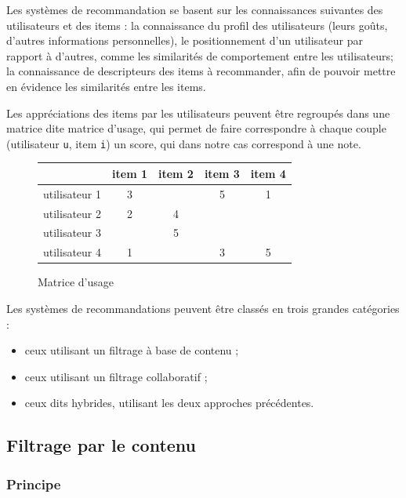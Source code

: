 \documentclass{article}
\begin{document}
Les systèmes de recommandation se basent sur les connaissances suivantes des utilisateurs et des items : la connaissance du profil des utilisateurs (leurs goûts, d'autres informations personnelles), le positionnement d'un utilisateur par rapport à d'autres, comme les similarités de comportement entre les utilisateurs; la connaissance de descripteurs des items à recommander, afin de pouvoir mettre en évidence les similarités entre les items.

Les appréciations des items par les utilisateurs peuvent être regroupés dans une matrice dite matrice d'usage, qui permet de faire correspondre à chaque couple (utilisateur \verb'u', item \verb'i') un score, qui dans notre cas correspond à une note.
 \begin{figure}[!h]
\begin{center}
\begin{tabular}{|c|c|c|c|c|}
\hline
&item 1&item 2&item 3&item 4\\
\hline
utilisateur 1&3&&5&1\\
\hline
utilisateur 2&2&4&&\\
\hline
utilisateur 3&&5&&\\
\hline
utilisateur 4&1&&3&5\\
\hline
\end{tabular}
\newline\newline
\caption{Matrice d'usage}
\end{center}
 \end{figure}

Les systèmes de recommandations peuvent être classés en trois grandes catégories : 
\begin{itemize}
    \item ceux utilisant un filtrage à base de contenu ;
    \item ceux utilisant un filtrage collaboratif ;
    \item ceux dits hybrides, utilisant les deux approches précédentes.
\end{itemize}


\subsection{Filtrage par le contenu}

\subsubsection{Principe}
\end{document}
